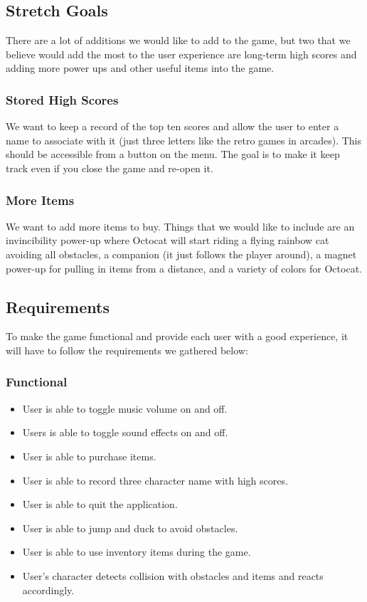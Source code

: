 \documentclass[10pt,conference,onecolumn,compsoc]{IEEEtran}
\begin{document}
\subsection{Stretch Goals}
There are a lot of additions we would like to add to the game, but two that we believe would add the most to the user experience are long-term high scores and adding more power ups and other useful items into the game.

\subsubsection{Stored High Scores}
We want to keep a record of the top ten scores and allow the user to enter a name to associate with it (just three letters like the retro games in arcades). This should be accessible from a button on the menu. The goal is to make it keep track even if you close the game and re-open it.

\subsubsection{More Items} We want to add more items to buy. Things that we would like to include are an invincibility power-up where Octocat will start riding a flying rainbow cat avoiding all obstacles, a companion (it just follows the player around), a magnet power-up for pulling in items from a distance, and a variety of colors for Octocat.

\subsection{Requirements}
To make the game functional and provide each user with a good experience, it will have to follow the requirements we gathered below:

\subsubsection{Functional}
\begin{itemize}
\item User is able to toggle music volume on and off.
\item Users is able to toggle sound effects on and off.
\item User is able to purchase items.
\item User is able to record three character name with high scores.
\item User is able to quit the application.
\item User is able to jump and duck to avoid obstacles.
\item User is able to use inventory items during the game.
\item User's character detects collision with obstacles and items and reacts accordingly.
\end{itemize}
\end{document}
